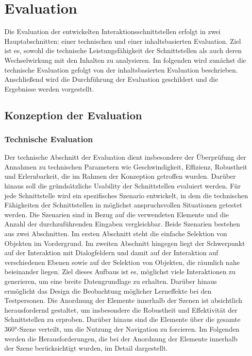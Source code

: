 \chapter{Evaluation}
\label{chap:Evaluation}

Die Evaluation der entwickelten Interaktionsschnittstellen erfolgt in zwei Hauptabschnitten: einer technischen und einer inhaltsbasierten Evaluation. Ziel ist es, sowohl die technische Leistungsfähigkeit der Schnittstellen als auch deren Wechselwirkung mit den Inhalten zu analysieren. Im folgenden wird zunächst die technische Evaluation gefolgt von der inhaltsbasierten Evaluation beschrieben. Anschließend wird die Durchführung der Evaluation geschildert und die Ergebnisse werden vorgestellt. 

\section{Konzeption der Evaluation}

\subsection{Technische Evaluation}

Der technische Abschnitt der Evaluation dient insbesondere der Überprüfung der Annahmen zu technischen Parametern wie Geschwindigkeit, Effizienz, Robustheit und Erlernbarkeit, die im Rahmen der Konzeption getroffen wurden. Darüber hinaus soll die gründsätzliche Usability der Schnittstellen evaluiert werden. Für jede Schnittstelle wird ein spezifisches Szenario entwickelt, in dem die technischen Fähigkeiten der Schnittstellen in möglichst anspruchsvollen Situationen getestet werden. Die Szenarien sind in Bezug auf die verwendeten Elemente und die Anzahl der durchzuführenden Eingaben vergleichbar. Beide Szenarien bestehen aus zwei Abschnitten. Im ersten Abschnitt steht die einfache Selektion von Objekten im Vordergrund. Im zweiten Abschnitt hingegen liegt der Schwerpunkt auf der Interaktion mit Dialogfeldern und damit auf der Interaktion auf verschiedenen Ebenen sowie auf der Selektion von Objekten, die räumlich nahe beieinander liegen. Ziel dieses Aufbaus ist es, möglichst viele Interaktionen zu generieren, um eine breite Datengrundlage zu erhalten. Darüber hinaus ermöglicht das Design die Beobachtung möglicher Lerneffekte bei den Testpersonen. Die Anordnung der Elemente innerhalb der Szenen ist absichtlich herausfordernd gestaltet, um insbesondere die Robustheit und Effektivität der Schnittstellen zu erproben. Darüber hinaus sind die Elemente über die gesamte 360°-Szene verteilt, um die Nutzung der Navigation zu forcieren. Im Folgenden werden die Herausforderungen, die bei der Anordnung der Elemente innerhalb der Szene berücksichtigt wurden, im Detail dargestellt. 

